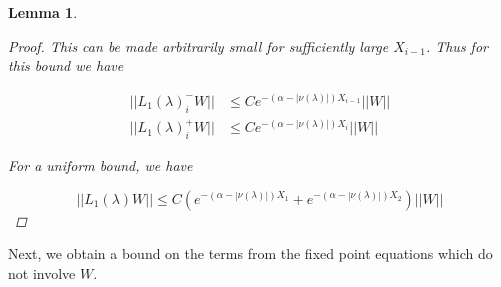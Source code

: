\documentclass[12pt]{article}
\newtheorem{lemma}{Lemma}
\begin{document}
\begin{lemma}
\begin{proof}
This can be made arbitrarily small for sufficiently large $X_{i-1}$. Thus for this bound we have

\begin{align*}
||L_1(\lambda)_i^- W|| &\leq C e^{-(\alpha -|\nu(\lambda)|)X_{i-1}} ||W|| \\
||L_1(\lambda)_i^+ W|| &\leq C e^{-(\alpha -|\nu(\lambda)|)X_i} ||W||
\end{align*}

For a uniform bound, we have

\[
||L_1(\lambda)W|| \leq 
C (e^{-(\alpha -|\nu(\lambda)|)X_1} + e^{-(\alpha -|\nu(\lambda)|)X_2})||W||
\]

\end{proof}
\end{lemma}

Next, we obtain a bound on the terms from the fixed point equations which do not involve $W$. 

\end{document}
